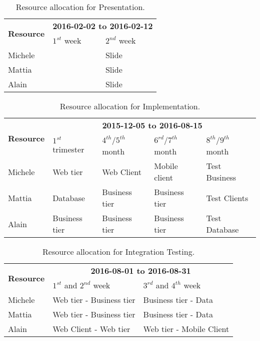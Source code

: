 \begin{table}
    \centering
    \begin{tabular}{| l | l | l |}
        \hline
        \multirow{2}{*}{\textbf{Resource}} & \multicolumn{2}{c|}{\textbf{2016-02-02 to 2016-02-12}} \\
        \cline{2-3}
        & $1^{st}$ week & $2^{nd}$ week \\
        \hline
        Michele         &     & Slide    \\
        Mattia          &     & Slide    \\
        Alain           &     & Slide    \\
        \hline
    \end{tabular}
    \caption{Resource allocation for Presentation.}
    \label{tab:pres-res-alloc}
\end{table}


\begin{table}
    \centering
    \begin{tabular}{| l | l | l | l | l |}
        \hline
        \multirow{2}{*}{\textbf{Resource}} & \multicolumn{4}{c|}{\textbf{2015-12-05 to 2016-08-15}} \\
        \cline{2-5}
        & $1^{st}$ trimester & $4^{th}$/$5^{th}$ month & $6^{rd}$/$7^{th}$ month & $8^{th}$/$9^{th}$ month\\
        \hline
        Michele        & Web tier       & Web Client     & Mobile client   & Test Business    \\
        Mattia         & Database       & Business tier  & Business tier   & Test Clients   \\
        Alain          & Business tier  & Business tier  & Business tier   & Test Database  \\
        \hline
    \end{tabular}
    \caption{Resource allocation for Implementation.}
    \label{tab:impl-res-alloc}
\end{table}

\begin{table}
    \centering
    \begin{tabular}{| l | l | l |}
        \hline
        \multirow{2}{*}{\textbf{Resource}} & \multicolumn{2}{c|}{\textbf{2016-08-01 to 2016-08-31}} \\
        \cline{2-3}
        & $1^{st}$ and $2^{nd}$ week & $3^{rd}$ and $4^{th}$ week \\
        \hline
        Michele       &   Web tier - Business tier    & Business tier  - Data     \\
        Mattia        &   Web tier - Business tier    & Business tier  - Data    \\
        Alain         &   Web Client - Web tier       & Web tier - Mobile Client    \\
        \hline
    \end{tabular}
    \caption{Resource allocation for Integration Testing.}
    \label{tab:int-test-res-alloc}
\end{table}
